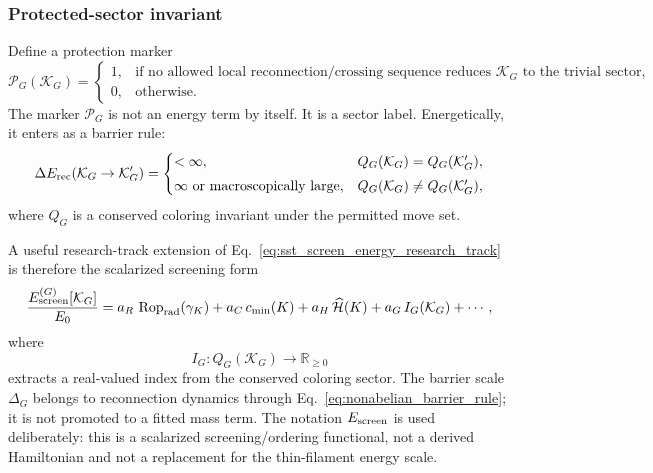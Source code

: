\subsubsection{Protected-sector invariant}
Define a protection marker
\begin{equation}
    \mathcal P_G(\mathcal K_G)=
    \begin{cases}
        1, & \text{if no allowed local reconnection/crossing sequence reduces }\mathcal K_G\text{ to the trivial sector},\\[0.3em]
        0, & \text{otherwise.}
    \end{cases}
    \label{eq:protection_marker}
\end{equation}
The marker $\mathcal P_G$ is not an energy term by itself. It is a sector label. Energetically, it enters as a barrier rule:
\begin{equation}
    \Delta E_{\rm rec}(\mathcal K_G\rightarrow \mathcal K'_G)=
    \begin{cases}
        <\infty, & Q_G(\mathcal K_G)=Q_G(\mathcal K'_G),\\[0.3em]
        \infty \text{ or macroscopically large}, & Q_G(\mathcal K_G)\neq Q_G(\mathcal K'_G),
    \end{cases}
    \label{eq:nonabelian_barrier_rule}
\end{equation}
where $Q_G$ is a conserved coloring invariant under the permitted move set.

A useful research-track extension of Eq.~\eqref{eq:sst_screen_energy_research_track} is therefore the scalarized screening form
\begin{equation}
    \frac{E_{\rm screen}^{(G)}[\mathcal K_G]}{E_0}
    =
    a_R\,\operatorname{Rop}_{\rm rad}(\gamma_K)
    +a_C\,c_{\min}(K)
    +a_H\,\widehat{\mathcal H}(K)
    +a_G\,I_G(\mathcal K_G)
    +\cdots,
    \label{eq:nonabelian_extended_energy}
\end{equation}
where
\begin{equation}
    I_G:Q_G(\mathcal K_G)\longrightarrow \mathbb R_{\ge 0}
\end{equation}
extracts a real-valued index from the conserved coloring sector.  The barrier scale $\Delta_G$ belongs to reconnection dynamics through Eq.~\eqref{eq:nonabelian_barrier_rule}; it is not promoted to a fitted mass term.  The notation $E_{\rm screen}$ is used deliberately: this is a scalarized screening/ordering functional, not a derived Hamiltonian and not a replacement for the thin-filament energy scale.

